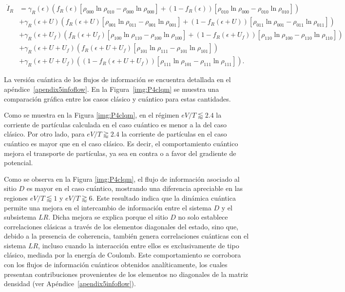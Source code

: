 \begin{align*}
 \dot{I}_{R} & =  \gamma_{R}(\epsilon)(f_{R}(\epsilon)[\rho_{000}\ln \rho_{010} - \rho_{000}\ln \rho_{000}] + (1-f_{R}(\epsilon))[\rho_{010}\ln \rho_{000} - \rho_{010}\ln \rho_{010} ] )  \\ 
      & + \gamma_{R}(\epsilon + U)(f_{R}(\epsilon + U)[\rho_{001}\ln \rho_{011} - \rho_{001}\ln \rho_{001}] + (1-f_{R}(\epsilon + U))[\rho_{011}\ln \rho_{001} -\rho_{011}\ln \rho_{011} ]   ) \\  
      & + \gamma_{R}(\epsilon + U_{f})( f_{R}(\epsilon + U_{f})[\rho_{100}\ln \rho_{110} - \rho_{100}\ln \rho_{100} ]  + (1-f_{R}(\epsilon + U_{f}))[\rho_{110}\ln \rho_{100} - \rho_{110}\ln \rho_{110} ] ) \\  
      & + \gamma_{R}(\epsilon + U + U_{f})( f_{R}(\epsilon + U + U_{f})[\rho_{101}\ln \rho_{111}- \rho_{101}\ln \rho_{101}]) \\   
      & + \gamma_{R}(\epsilon + U + U_{f})( (1-f_{R}(\epsilon+U+U_{f}) )[\rho_{111}\ln \rho_{101} - \rho_{111}\ln \rho_{111}]).   
\end{align*}

La versión cuántica de los flujos de información se encuentra detallada en el apéndice~\ref{apendix5infoflow}. En la Figura~\ref{img:P4clqm} se muestra una comparación gráfica entre los casos clásico y cuántico para estas cantidades.


Como se muestra en la Figura \ref{img:P4clqm}, en el régimen $eV/T\lessapprox 2.4$ la corriente de partículas calculada en el caso cuántico es menor a la del caso clásico. Por otro lado, para $eV/T \gtrapprox 2.4$ la corriente de partículas en el caso cuántico es mayor que en el caso clásico. Es decir, el comportamiento cuántico mejora el transporte de partículas, ya sea en contra o a favor del gradiente de potencial. 

Como se observa en la Figura \ref{img:P4clqm}, el flujo de información asociado al sitio $D$ es mayor en el caso cuántico, mostrando una diferencia apreciable en las regiones $eV/T \lessapprox 1$ y $eV/T \gtrapprox 6$. Este resultado indica que la dinámica cuántica permite una mejora en el intercambio de información entre el sistema $D$ y el subsistema $LR$. Dicha mejora se explica porque el sitio $D$ no solo establece correlaciones clásicas a través de los elementos diagonales del estado, sino que, debido a la presencia de coherencia, también genera correlaciones cuánticas con el sistema $LR$, incluso cuando la interacción entre ellos es exclusivamente de tipo clásico, mediada por la energía de Coulomb. Este comportamiento se corrobora con los flujos de información cuánticos obtenidos analíticamente, los cuales presentan contribuciones provenientes de los elementos no diagonales de la matriz densidad (ver Apéndice~\ref{apendix5infoflow}).
 

